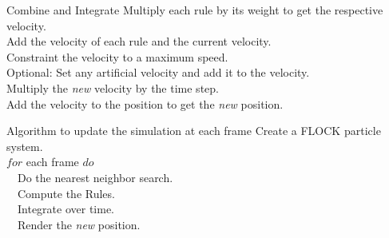 \documentclass[red]{beamer}
\begin{document}
\begin{frame}{Combine and Integrate}
 	\alert<1>{Multiply each rule by its weight to get the respective velocity.} 	\\
	\alert<2>{Add the velocity of each rule and the current velocity.} 	\\
	\alert<3>{Constraint the velocity to a maximum speed.}			\\ 
	\alert<4>{Optional: Set any artificial velocity and add it to the velocity.}	\\ 
	\alert<5>{Multiply the \textit{new} velocity by the time step.}			\\
	\alert<6>{Add the velocity to the position to get the \textit{new} position.}	\\
\end{frame}

\begin{frame}{Algorithm to update the simulation at each frame}
		\alert<1>{Create a FLOCK particle system.}	\\
		\alert<2>{$for$ each frame $do$}			\\
		\alert<3>{~~Do the nearest neighbor search.}	\\
		\alert<4>{~~Compute the Rules.}				\\
		\alert<5>{~~Integrate over time.}				\\
		\alert<6>{~~Render the \textit{new} position.}	\\	
\end{frame}


\end{document}
